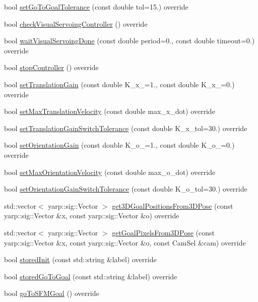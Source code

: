 \begin{DoxyCompactItemize}
\item 
bool \hyperlink{classVisualServoingClient_a64ac96092017671a9ffc8498fb10e5fa}{set\+Go\+To\+Goal\+Tolerance} (const double tol=15.) override
\item 
bool \hyperlink{classVisualServoingClient_a833cf672981b3a422a0ac41b2845a6c1}{check\+Visual\+Servoing\+Controller} () override
\item 
bool \hyperlink{classVisualServoingClient_aee7dc8c7897bf2ecaf417e9126fd640e}{wait\+Visual\+Servoing\+Done} (const double period=0., const double timeout=0.) override
\item 
bool \hyperlink{classVisualServoingClient_aad4f96122bd48b7e8aa08673bde3031b}{stop\+Controller} () override
\item 
bool \hyperlink{classVisualServoingClient_a0ed003d4d4905c72a5cb05e5a8224916}{set\+Translation\+Gain} (const double K\+\_\+x\+\_=1., const double K\+\_\+x\+\_=0.) override
\item 
bool \hyperlink{classVisualServoingClient_acf12ca40f4a4070f8c6ed36b21c0e9e4}{set\+Max\+Translation\+Velocity} (const double max\+\_\+x\+\_\+dot) override
\item 
bool \hyperlink{classVisualServoingClient_a1b8a1af7306d708a56766d69af1a3086}{set\+Translation\+Gain\+Switch\+Tolerance} (const double K\+\_\+x\+\_\+tol=30.) override
\item 
bool \hyperlink{classVisualServoingClient_a3df91c530a6aec77e9fd6d418ba3efaf}{set\+Orientation\+Gain} (const double K\+\_\+o\+\_=1., const double K\+\_\+o\+\_=0.) override
\item 
bool \hyperlink{classVisualServoingClient_a0caa332fbb62645312593b053d62d02c}{set\+Max\+Orientation\+Velocity} (const double max\+\_\+o\+\_\+dot) override
\item 
bool \hyperlink{classVisualServoingClient_acaa5865c6709780f9c6ea6d31687ac2e}{set\+Orientation\+Gain\+Switch\+Tolerance} (const double K\+\_\+o\+\_\+tol=30.) override
\item 
std\+::vector$<$ yarp\+::sig\+::\+Vector $>$ \hyperlink{classVisualServoingClient_a23fb8539faf13002caa40123dce709a1}{get3\+D\+Goal\+Positions\+From3\+D\+Pose} (const yarp\+::sig\+::\+Vector \&x, const yarp\+::sig\+::\+Vector \&o) override
\item 
std\+::vector$<$ yarp\+::sig\+::\+Vector $>$ \hyperlink{classVisualServoingClient_aa9ede5b1061b05533ac1c8cc7c52183c}{get\+Goal\+Pixels\+From3\+D\+Pose} (const yarp\+::sig\+::\+Vector \&x, const yarp\+::sig\+::\+Vector \&o, const Cam\+Sel \&cam) override
\item 
bool \hyperlink{classVisualServoingClient_a0b7df161daebc8c947c8a29ad7e309ef}{stored\+Init} (const std\+::string \&label) override
\item 
bool \hyperlink{classVisualServoingClient_af1070526a82d7e99bb0dba8a34bc68cf}{stored\+Go\+To\+Goal} (const std\+::string \&label) override
\item 
bool \hyperlink{classVisualServoingClient_ab5c9cf7eb3967b9f28e298ac58f7bb86}{go\+To\+S\+F\+M\+Goal} () override
\end{DoxyCompactItemize}
